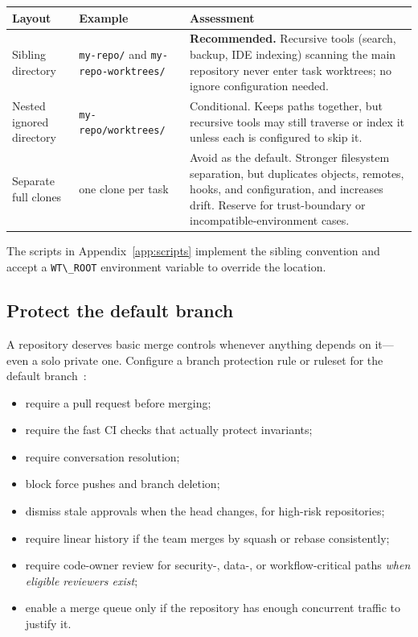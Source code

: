 \documentclass[11pt]{article}
\newcommand{\co}[1]{\lstinline[basicstyle=\ttfamily\color{gwInk}]{#1}}
\begin{document}
\begin{center}
\begin{tabularx}{\textwidth}{@{}l Y Y@{}}
\toprule
\textbf{Layout} & \textbf{Example} & \textbf{Assessment} \\
\midrule
Sibling directory & \co{my-repo/} and \co{my-repo-worktrees/} &
  \textbf{Recommended.} Recursive tools (search, backup, IDE indexing) scanning the main
  repository never enter task worktrees; no ignore configuration needed. \\
Nested ignored directory & \co{my-repo/worktrees/} & Conditional. Keeps paths
  together, but recursive tools may still traverse or index it unless each is configured to
  skip it. \\
Separate full clones & one clone per task & Avoid as the default. Stronger filesystem
  separation, but duplicates objects, remotes, hooks, and configuration, and increases drift.
  Reserve for trust-boundary or incompatible-environment cases. \\
\bottomrule
\end{tabularx}
\end{center}

The scripts in Appendix~\ref{app:scripts} implement the sibling convention and accept a
\co{WT\_ROOT} environment variable to override the location.

\subsection{Protect the default branch}

A repository deserves basic merge controls whenever anything depends on it---even a solo private
one. Configure a branch protection rule or ruleset for the default
branch~\cite{github2026branchprotect,github2026rulesets}:

\begin{itemize}
  \item require a pull request before merging;
  \item require the fast CI checks that actually protect invariants;
  \item require conversation resolution;
  \item block force pushes and branch deletion;
  \item dismiss stale approvals when the head changes, for high-risk repositories;
  \item require linear history if the team merges by squash or rebase consistently;
  \item require code-owner review for security-, data-, or workflow-critical paths \emph{when
    eligible reviewers exist};
  \item enable a merge queue only if the repository has enough concurrent traffic to justify it.
\end{itemize}
\end{document}
